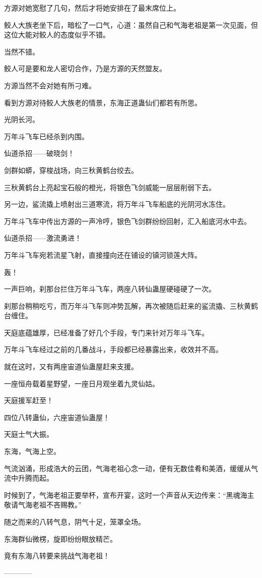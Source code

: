 \begin{this_body}
方源对她宽慰了几句，然后才将她安排在了最末席位上。

鲛人大族老坐下后，暗松了一口气，心道：虽然自己和气海老祖是第一次见面，但这位大能对鲛人的态度似乎不错。

当然不错。

鲛人可是要和龙人密切合作，乃是方源的天然盟友。

方源当然不会对她有所刁难。

看到方源对待鲛人大族老的情景，东海正道蛊仙们都若有所思。

光阴长河。

万年斗飞车已经杀到内围。

仙道杀招——破晓剑！

剑群如蟒，穿梭战场，向三秋黄鹤台绞去。

三秋黄鹤台上亮起宝石般的橙光，将银色飞剑威能一层层削弱下去。

另一边，鲨流撬上喷射出三道寒流，将万年斗飞车船底的光阴河水冻住。

万年斗飞车中传出方源的一声冷哼，银色飞剑群纷纷回射，汇入船底河水中去。

仙道杀招——激流勇进！

万年斗飞车宛若流星飞射，直接撞向还在铺设的镇河锁莲大阵。

轰！

一声巨响，刹那台拦住万年斗飞车，两座八转仙蛊屋硬碰硬了一次。

刹那台稍稍吃亏，而万年斗飞车则冲势瓦解，再次被随后赶来的鲨流撬、三秋黄鹤台缠住。

天庭底蕴雄厚，已经准备了好几个手段，专门来针对万年斗飞车。

万年斗飞车经过之前的几番战斗，手段都已经暴露出来，收效并不高。

就在这时，又有两座宙道仙蛊屋赶来支援。

一座恒舟载着星野望，一座日月观坐着九灵仙姑。

天庭援军赶至！

四位八转蛊仙，六座宙道仙蛊屋！

天庭士气大振。

东海，气海上空。

气流汹涌，形成浩大的云团，气海老祖心念一动，便有无数佳肴和美酒，缓缓从气流中升腾而起。

时候到了，气海老祖正要举杯，宣布开宴，这时一个声音从天边传来：“黑魂海主敬请气海老祖不吝赐教。”

随之而来的八转气息，阴气十足，笼罩全场。

东海群仙微楞，旋即纷纷眼放精芒。

竟有东海八转要来挑战气海老祖！

------------

\end{this_body}

